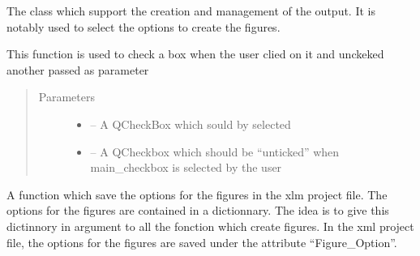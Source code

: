 \documentclass[letterpaper,10pt,english]{sphinxmanual}
\begin{document}
\begin{fulllineitems}
\label{\detokenize{index:src_GUI.output_fig_GUI.PreferenceWindow}}
The class which support the creation and management of the output. It is notably used to select the options to
create the figures.

\begin{fulllineitems}
\label{\detokenize{index:src_GUI.output_fig_GUI.PreferenceWindow.check_uncheck}}
This function is used to check a box when the user clied on it and unckeked another passed as parameter
\begin{quote}\begin{description}
\item[{Parameters}] \leavevmode\begin{itemize}
\item {} 
 -- A QCheckBox which sould by selected

\item {} 
 -- A QCheckbox which should be ``unticked'' when main\_checkbox is selected by the user

\end{itemize}

\end{description}\end{quote}

\end{fulllineitems}


\begin{fulllineitems}
\label{\detokenize{index:src_GUI.output_fig_GUI.PreferenceWindow.init_iu}}
\end{fulllineitems}


\begin{fulllineitems}
\label{\detokenize{index:src_GUI.output_fig_GUI.PreferenceWindow.save_option_fig}}
A function which save the options for the figures in the xlm project file. The options for the figures are
contained in a dictionnary. The idea is to give this dictinnory in argument to all the fonction which create
figures. In the xml project file, the options for the figures are saved under the attribute ``Figure\_Option''.


\end{fulllineitems}
\end{fulllineitems}
\end{document}
